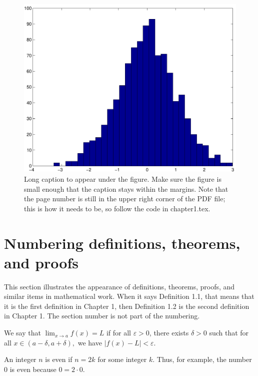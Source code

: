 \begin{landscape}
\thispagestyle{lscape}
\pagestyle{lscape}
  \begin{figure}
    \includegraphics[width=\linewidth,height=\textheight-1in]{figure.pdf}
    \caption[Short caption for List of Figures]{Long caption to appear under the figure.  Make sure the figure is small enough that the caption stays within the margins.  Note that the page number is still in the upper right corner of the PDF file; this is how it needs to be, so follow the code in chapter1.tex.}
  \end{figure}
\end{landscape}

\section{Numbering definitions, theorems, and proofs}
This section illustrates the appearance of definitions, theorems, proofs, and similar items in mathematical work.
When it says Definition 1.1, that means that it is the first definition in Chapter 1, then Definition 1.2 is the second definition in Chapter 1.
The section number is not part of the numbering.

\begin{definition}
We say that $\lim_{x \to a} f(x) = L$ if for all $\varepsilon > 0$, there exists $\delta > 0$ such that for all $x \in (a-\delta,a+\delta),$ we have $|f(x) - L| < \varepsilon$.
\end{definition}

\begin{definition}
An integer $n$ is even if $n=2k$ for some integer $k$.
Thus, for example, the number $0$ is even because $0=2\cdot 0$.
\end{definition}

